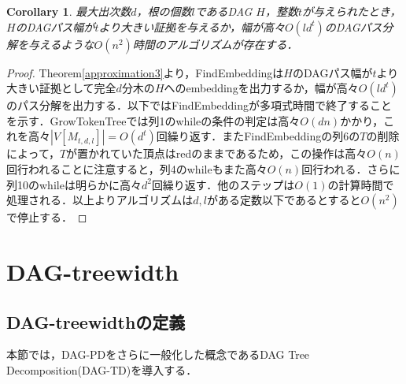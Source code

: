 \documentclass[master]{kuisthesis}		%
\theoremstyle{plain}
\newtheorem{cor}{Corollary}
\theoremstyle{definition}
\begin{document}
\begin{cor}
    最大出次数$d$，根の個数$l$であるDAG $H$，整数$t$が与えられたとき，$H$のDAGパス幅が$t$より大きい証拠を与えるか，幅が高々$O(ld^t)$のDAGパス分解を与えるような$O(n^2)$時間のアルゴリズムが存在する．
\end{cor}

\begin{proof}
    Theorem\ref{approximation3}より，FindEmbeddingは$H$のDAGパス幅が$t$より大きい証拠として完全$d$分木の$H$へのembeddingを出力するか，幅が高々$O(ld^t)$のパス分解を出力する．以下ではFindEmbeddingが多項式時間で終了することを示す．GrowTokenTreeでは列1のwhileの条件の判定は高々$O(dn)$かかり，これを高々$|V[M_{t, d, l}]| = O(d^t)$回繰り返す．またFindEmbeddingの列6の$T$の削除によって，$T$が置かれていた頂点はredのままであるため，この操作は高々$O(n)$回行われることに注意すると，列4のwhileもまた高々$O(n)$回行われる．さらに列10のwhileは明らかに高々$d^2$回繰り返す．他のステップは$O(1)$の計算時間で処理される．以上よりアルゴリズムは$d, l$がある定数以下であるとすると$O(n^2)$で停止する．
\end{proof}




















\section{DAG-treewidth} %

\subsection{DAG-treewidthの定義}

本節では，DAG-PDをさらに一般化した概念であるDAG Tree Decomposition(DAG-TD)を導入する．
\end{document}
